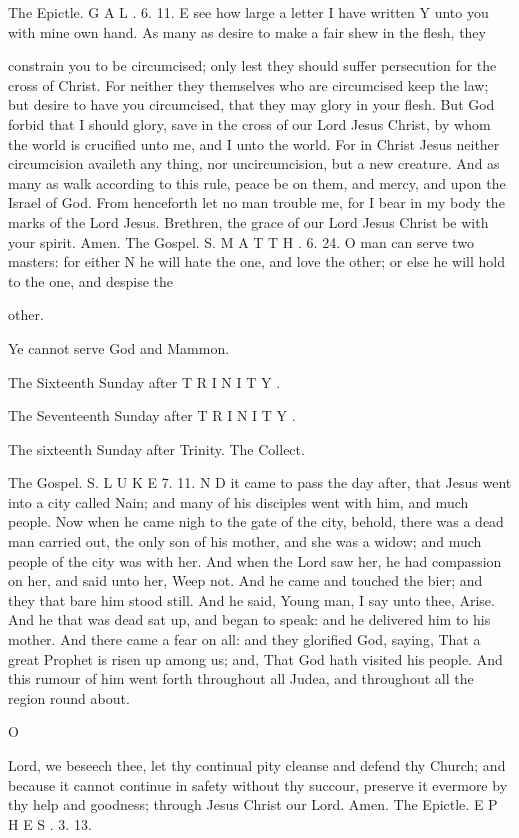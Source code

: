 The Epictle. G A L . 6. 11. E see how large a letter I have written Y unto you with mine own hand. As many as desire to make a fair shew in the flesh, they

constrain you to be circumcised; only lest they should suffer persecution for the cross of Christ. For neither they themselves who are circumcised keep the law; but desire to have you circumcised, that they may glory in your flesh. But God forbid that I should glory, save in the cross of our Lord Jesus Christ, by whom the world is crucified unto me, and I unto the world. For in Christ Jesus neither circumcision availeth any thing, nor uncircumcision, but a new creature. And as many as walk according to this rule, peace be on them, and mercy, and upon the Israel of God. From henceforth let no man trouble me, for I bear in my body the marks of the Lord Jesus. Brethren, the grace of our Lord Jesus Christ be with your spirit. Amen. The Gospel. S. M A T T H . 6. 24. O man can serve two masters: for either N he will hate the one, and love the other; or else he will hold to the one, and despise the

other.

Ye cannot serve God and Mammon.

The Sixteenth Sunday after T R I N I T Y .

The Seventeenth Sunday after T R I N I T Y .

The sixteenth Sunday after Trinity. The Collect.

The Gospel. S. L U K E 7. 11. N D it came to pass the day after, that Jesus went into a city called Nain; and many of his disciples went with him, and much people. Now when he came nigh to the gate of the city, behold, there was a dead man carried out, the only son of his mother, and she was a widow; and much people of the city was with her. And when the Lord saw her, he had compassion on her, and said unto her, Weep not. And he came and touched the bier; and they that bare him stood still. And he said, Young man, I say unto thee, Arise. And he that was dead sat up, and began to speak: and he delivered him to his mother. And there came a fear on all: and they glorified God, saying, That a great Prophet is risen up among us; and, That God hath visited his people. And this rumour of him went forth throughout all Judea, and throughout all the region round about.

O

Lord, we beseech thee, let thy continual pity cleanse and defend thy Church; and because it cannot continue in safety without thy succour, preserve it evermore by thy help and goodness; through Jesus Christ our Lord. Amen. The Epictle. E P H E S . 3. 13.

